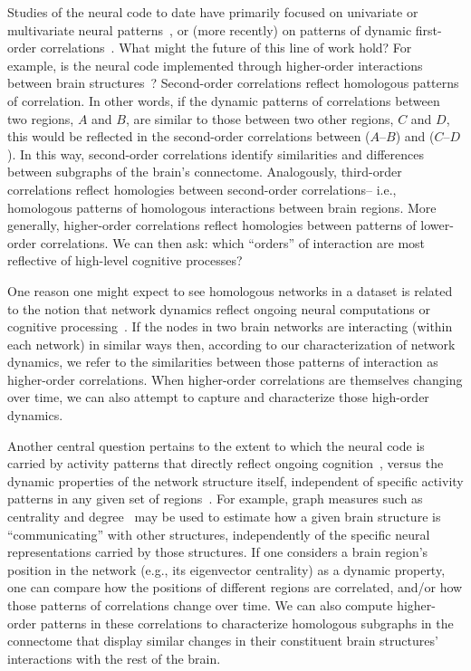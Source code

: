 \documentclass[english]{article}
\begin{document}
Studies of the neural code to date have primarily focused on
univariate or multivariate neural patterns~\citep[for review
see][]{NormEtal06b}, or (more recently) on patterns of dynamic
first-order correlations~\citep[i.e., interactions between pairs of
brain structures;][]{MannEtal18, FongEtal19, LuriEtal18, PretEtal17,
  ZouEtal19, DemeEtal19}.  What might the future of this line of work
hold?  For example, is the neural code implemented through
higher-order interactions between brain structures~\citep[e.g.,
see][]{ReimEtal17}?  Second-order correlations reflect
homologous patterns of correlation.  In other words, if the
dynamic patterns of correlations between two regions, $A$ and $B$, are
similar to those between two other regions, $C$ and $D$, this would be
reflected in the second-order correlations between ($A$--$B$) and
($C$--$D$).  In this way, second-order correlations identify
similarities and differences between subgraphs of the brain's
connectome.  Analogously, third-order correlations reflect homologies
between second-order correlations-- i.e., homologous patterns of
homologous interactions between brain regions.  More generally,
higher-order correlations reflect homologies between patterns of
lower-order correlations.  We can then ask: which ``orders'' of
interaction are most reflective of high-level cognitive processes?

One reason one might expect to see homologous networks in a dataset is
related to the notion that network dynamics reflect ongoing neural
computations or cognitive processing~\citep[e.g.,][]{BeatEtal16}.  If
the nodes in two brain networks are interacting (within each network)
in similar ways then, according to our characterization of network
dynamics, we refer to the similarities between those patterns of
interaction as higher-order correlations.  When higher-order
correlations are themselves changing over time, we can also attempt to
capture and characterize those high-order dynamics.

Another central question pertains to the extent to which the neural
code is carried by activity patterns that directly reflect ongoing
cognition~\citep[e.g., following][]{HaxbEtal01, NormEtal06b}, versus
the dynamic properties of the network structure itself, independent of
specific activity patterns in any given set of regions~\citep[e.g.,
following][]{BassEtal06}.  For example, graph measures such as
centrality and degree~\citep{BullSpor09} may be used to estimate how a
given brain structure is ``communicating'' with other structures,
independently of the specific neural representations carried by those
structures.  If one considers a brain region's position in the network
(e.g., its eigenvector centrality) as a dynamic property, one can
compare how the positions of different regions are correlated, and/or
how those patterns of correlations change over time.  We can also
compute higher-order patterns in these correlations to characterize
homologous subgraphs in the connectome that display similar changes in
their constituent brain structures' interactions with the rest of the
brain.
\end{document}
